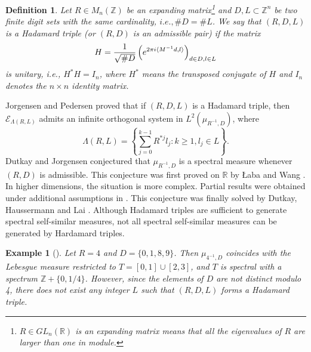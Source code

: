 \documentclass[11pt]{article}
\newtheorem{definition}{Definition}[section]
\newtheorem{example}[theorem]{Example}
\numberwithin{equation}{section}
\begin{document}
\begin{definition}\label{2.5}
	Let $R \in M_n(\mathbb{Z})$ be an expanding matrix\footnote{ $R\in GL_n(\mathbb{R})$ is an expanding matrix means that all the eigenvalues of $R$ are larger than one in module.} and $D,L \subset \mathbb{Z}^n$ be two finite digit sets with the same cardinality, $i.e.,\#D=\#L$. We say that $(R,D,L)$ is a Hadamard triple (or $(R,D)$ is an admissible pair) if the matrix
	\begin{align}
		H=\frac{1}{\sqrt{\#D}} \left( e^{2 \pi i \langle M^{-1}d,l \rangle} \right)_{d \in D,l \in L}   \notag
	\end{align}
	is unitary, i.e., $H^{\ast}H=I_n$, where $H^{\ast}$ means the transposed conjugate of $H$ and $I_n$ denotes the $n\times n$ identity matrix.
\end{definition}

Jorgensen and Pedersen \cite{Jorgensen-Pedersen_1998} proved that if $(R,D,L)$ is a Hadamard triple, then
$\mathcal{E}_{\Lambda(R,L)}$ admits an infinite orthogonal system in $L^2(\mu_{R^{-1},D})$, where
\[
\Lambda(R,L)=\left\{\sum_{j=0}^{k-1} R^{*j}l_j:k\geq1,  l_j\in L \right\}.
\]
Dutkay and Jorgensen \cite{DJ_2007,DJ_2009} conjectured that $\mu_{R^{-1},D}$ is a spectral measure whenever $(R,D)$ is admissible.
This conjecture was first proved on $\mathbb{R}$ by \L aba and Wang \cite{LaW_2002}.
In higher dimensions, the situation is more complex.
Partial results were obtained under additional assumptions in \cite{DJ_2007,Strichartz_2000}.
This conjecture was finally solved by Dutkay, Haussermann and Lai \cite{Dut-Hau-Lai2019}.
Although Hadamard triples are sufficient to generate spectral self-similar measures, not all spectral self-similar measures can be generated by Hardamard triples.




\begin{example}[\cite{DJ_2009_2}]\label{examp1.2}
	Let \( R = 4 \) and \( D = \{0, 1, 8, 9\} \). Then $\mu_{4^{-1},D}$ coincides with the Lebesgue measure restricted to \( T = [0,1] \cup [2,3] \), and  $T$ is spectral with a spectrum \( \mathbb{Z} + \{0,1/4\} \). However, since the elements of $D$ are not distinct modulo 4, there does not exist any integer $L$ such that \( (R, D, L) \) forms a Hadamard triple.
\end{example}
\end{document}
